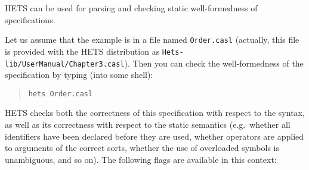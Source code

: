 \documentclass{article}
\newcommand{\normalTEXTSC}[2]{{#1\scriptsize#2}}
\newcommand     {\Hets}{\normalTEXTSC{H}{ETS}\xspace}
\begin{document}
\Hets can be used for parsing and
checking static well-formedness of specifications.


Let us assume that the example is in a file named
\texttt{Order.casl} (actually, this file is provided
with the \Hets distribution as \texttt{Hets-lib/UserManual/Chapter3.casl}).
Then you can check the well-formedness of the
specification by typing (into some shell):

\begin{quote}
\texttt{hets Order.casl}
\end{quote}
\Hets checks both the correctness of this specification
 with respect to the \CASL syntax, as
well as its correctness with respect to the static semantics (e.g.\
whether all identifiers have been declared before they are used,
whether operators are applied to arguments of the correct sorts,
whether the use of overloaded symbols is unambiguous, and so on).
The following flags are available in this context:
\end{document}
